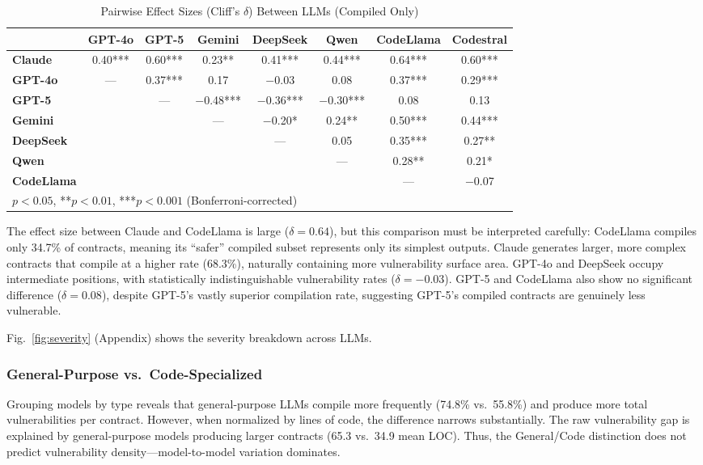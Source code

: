 \begin{table}[t]
\caption{Pairwise Effect Sizes (Cliff's $\delta$) Between LLMs (Compiled Only)}
\label{tab:pairwise}
\centering
\footnotesize
\begin{tabular}{@{}lccccccc@{}}
\toprule
 & \textbf{GPT-4o} & \textbf{GPT-5} & \textbf{Gemini} & \textbf{DeepSeek} & \textbf{Qwen} & \textbf{CodeLlama} & \textbf{Codestral} \\
\midrule
\textbf{Claude} & 0.40*** & 0.60*** & 0.23** & 0.41*** & 0.44*** & 0.64*** & 0.60*** \\
\textbf{GPT-4o} & --- & 0.37*** & 0.17 & $-$0.03 & 0.08 & 0.37*** & 0.29*** \\
\textbf{GPT-5} & & --- & $-$0.48*** & $-$0.36*** & $-$0.30*** & 0.08 & 0.13 \\
\textbf{Gemini} & & & --- & $-$0.20* & 0.24** & 0.50*** & 0.44*** \\
\textbf{DeepSeek} & & & & --- & 0.05 & 0.35*** & 0.27** \\
\textbf{Qwen} & & & & & --- & 0.28** & 0.21* \\
\textbf{CodeLlama} & & & & & & --- & $-$0.07 \\
\bottomrule
\multicolumn{8}{l}{\scriptsize *$p<0.05$, **$p<0.01$, ***$p<0.001$ (Bonferroni-corrected)}
\end{tabular}
\end{table}

The effect size between Claude and CodeLlama is large ($\delta = 0.64$), but this comparison must be interpreted carefully: CodeLlama compiles only 34.7\% of contracts, meaning its ``safer'' compiled subset represents only its simplest outputs. Claude generates larger, more complex contracts that compile at a higher rate (68.3\%), naturally containing more vulnerability surface area. GPT-4o and DeepSeek occupy intermediate positions, with statistically indistinguishable vulnerability rates ($\delta = -0.03$). GPT-5 and CodeLlama also show no significant difference ($\delta = 0.08$), despite GPT-5's vastly superior compilation rate, suggesting GPT-5's compiled contracts are genuinely less vulnerable.

Fig.~\ref{fig:severity} (Appendix) shows the severity breakdown across LLMs.

\subsubsection{General-Purpose vs.\ Code-Specialized}
Grouping models by type reveals that general-purpose LLMs compile more frequently (74.8\% vs.\ 55.8\%) and produce more total vulnerabilities per contract. However, when normalized by lines of code, the difference narrows substantially. The raw vulnerability gap is explained by general-purpose models producing larger contracts (65.3 vs.\ 34.9 mean LOC). Thus, the General/Code distinction does not predict vulnerability density---model-to-model variation dominates.

